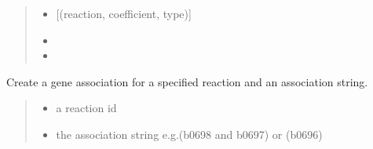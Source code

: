 \documentclass[letterpaper,12pt,english]{sphinxmanual}
\begin{document}
\begin{fulllineitems}
\begin{fulllineitems}
\begin{quote}
\begin{description}
\begin{itemize}
\item {} 
\sphinxAtStartPar
{} \textendash{} {[}(reaction, coefficient, type){]}

\item {} 
\sphinxAtStartPar
{}

\item {} 
\sphinxAtStartPar
{}

\end{itemize}

\end{description}\end{quote}

\end{fulllineitems}


\begin{fulllineitems}
\label{\detokenize{api/io:cbmpy.CBXML.FBCconnect.createGeneAssociationV1}}
\pysigstartsignatures
\pysiglinewithargsret
{}
{\sphinxparamcomma {}\sphinxparamcomma {}}
{}
\pysigstopsignatures
\sphinxAtStartPar
Create a gene association for a specified reaction and an association string.
\begin{quote}\begin{description}
\begin{itemize}
\item {} 
\sphinxAtStartPar
{} \textendash{} a reaction id

\item {} 
\sphinxAtStartPar
{} \textendash{} the association string e.g.(b0698 and b0697) or (b0696)

\end{itemize}

\end{description}\end{quote}

\end{fulllineitems}


\begin{fulllineitems}
\label{\detokenize{api/io:cbmpy.CBXML.FBCconnect.writeToFile}}
\pysigstartsignatures
\pysiglinewithargsret
{}
{}
{}
\pysigstopsignatures
\end{fulllineitems}


\end{fulllineitems}
\end{document}
